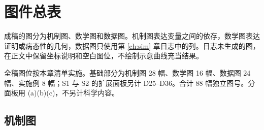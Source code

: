\chapter{图件总表}
\label{ch:figures}

成稿的图分为机制图、数学图和数据图。机制图表达变量之间的依存，数学图表达证明或病态性的几何，数据图只使用第 \ref{ch:sim} 章日志中的列。日志未生成的图，在正文中保留坐标说明和空白图位，不绘制示意曲线充当结果。

全稿图位按本章清单实施。基础部分为机制图 28 幅、数学图 16 幅、数据图 24 幅、实施例 8 幅；S1 与 S2 的扩展面板另计 D25--D36。合计 88 幅独立图号。分面板用 (a)(b)(c)，不另计科学内容。

\section{机制图}

